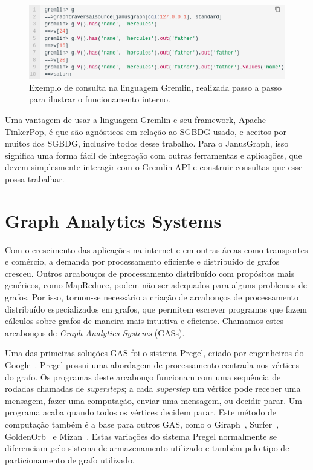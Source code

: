 \documentclass[conference]{IEEEtran}
\begin{document}
\begin{figure}[htbp]
\centerline{\includegraphics[width=0.9\linewidth]{janusgraph/janusgraph_ps2.png}}
\caption{Exemplo de consulta na linguagem Gremlin, realizada passo a passo
  para ilustrar o funcionamento interno.}\label{fig:janusgraph_ps2}
\label{fig}
\end{figure}

Uma vantagem de usar a linguagem Gremlin e seu framework, Apache TinkerPop,
é que são agnósticos em relação ao SGBDG usado, e aceitos por muitos dos SGBDG,
inclusive todos desse trabalho. Para o JanusGraph, isso significa uma forma
fácil de integração com outras ferramentas e aplicações, que devem
simplesmente interagir com o Gremlin API e construir consultas que esse
possa trabalhar.



\section{Graph Analytics Systems}
Com o crescimento das aplicações na internet e em outras áreas como
transportes e comércio, a demanda por processamento eficiente e
distribuído de grafos cresceu. Outros arcabouços de processamento
distribuído com propósitos mais genéricos, como MapReduce, podem não ser
adequados para alguns problemas de grafos. Por isso, tornou-se
necessário a criação de arcabouços de processamento distribuído
especializados em grafos, que permitem escrever programas que fazem
cálculos sobre grafos de maneira mais intuitiva e eficiente. Chamamos
estes arcabouços de {\em Graph Analytics Systems} (GASs).

Uma das primeiras soluções GAS foi o sistema Pregel, criado por
engenheiros do Google~\cite{pregel}. Pregel possui uma abordagem de
processamento centrada nos vértices do grafo. Os programas deste
arcabouço funcionam com uma sequência de rodadas chamadas de {\em
supersteps}; a cada {\em superstep} um vértice pode receber uma
mensagem, fazer uma computação, enviar uma mensagem, ou decidir parar.
Um programa acaba quando todos os vértices decidem parar. Este método de
computação também é a base para outros GAS, como o Giraph~\cite{giraph},
Surfer~\cite{surfer}, GoldenOrb~\cite{goldenorb} e Mizan~\cite{mizan}.
Estas variações do sistema Pregel normalmente se diferenciam pelo
sistema de armazenamento utilizado e também pelo tipo de particionamento
de grafo utilizado.
\end{document}
